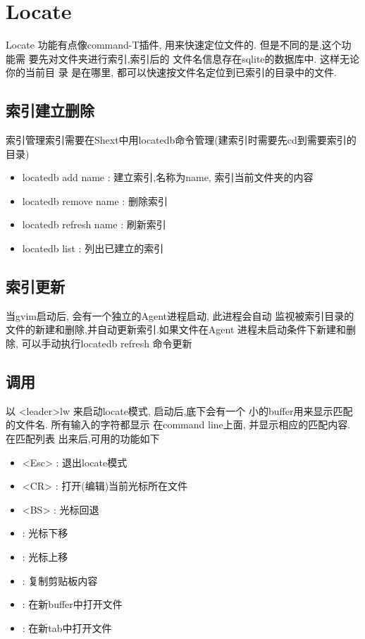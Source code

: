 \documentclass[oneside,openany]{book}
\begin{document}
\section{Locate}

    Locate 功能有点像command-T插件, 用来快速定位文件的. 但是不同的是,这个功能需
要先对文件夹进行索引,索引后的 文件名信息存在sqlite的数据库中. 这样无论你的当前目
录 是在哪里, 都可以快速按文件名定位到已索引的目录中的文件.

\subsection{索引建立删除}
  索引管理索引需要在Shext中用locatedb命令管理(建索引时需要先cd到需要索引的目录) 
  \begin{itemize}
      \item locatedb add name : 建立索引,名称为name, 索引当前文件夹的内容
      \item locatedb remove name : 删除索引
      \item locatedb refresh name : 刷新索引
      \item locatedb list : 列出已建立的索引 
  \end{itemize}

\subsection{索引更新}
    当gvim启动后, 会有一个独立的Agent进程启动, 此进程会自动 
监视被索引目录的文件的新建和删除,并自动更新索引.如果文件在Agent
进程未启动条件下新建和删除, 可以手动执行locatedb refresh 命令更新

\subsection{调用}
   以 <leader>lw 来启动locate模式, 启动后,底下会有一个
 小的buffer用来显示匹配的文件名. 所有输入的字符都显示
 在command line上面, 并显示相应的匹配内容. 在匹配列表
 出来后,可用的功能如下
    \begin{itemize}
        \item <Esc> : 退出locate模式
        \item <CR>  : 打开(编辑)当前光标所在文件 
        \item <BS>  : 光标回退
        \item <C-j> : 光标下移
        \item <C-k> : 光标上移
        \item <C-v> : 复制剪贴板内容
        \item <C-b> : 在新buffer中打开文件
        \item <C-t> : 在新tab中打开文件
    \end{itemize}
    
\end{document}

